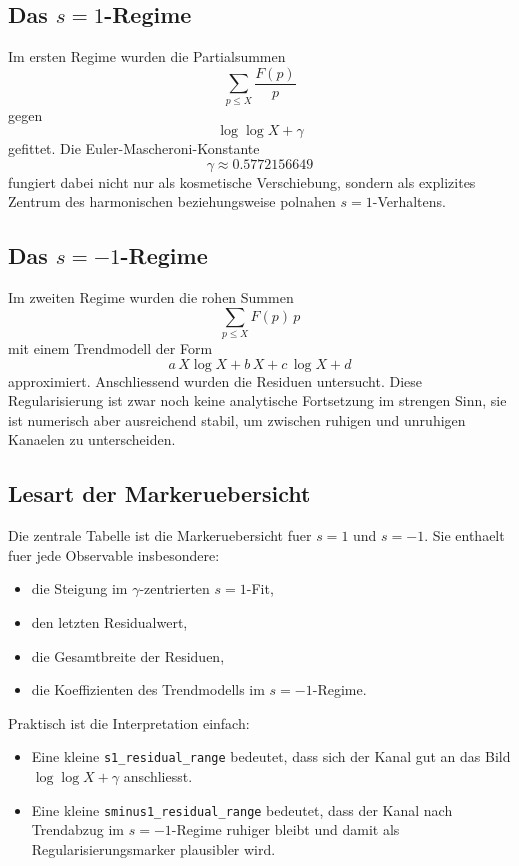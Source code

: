 \subsection{Das $s=1$-Regime}

Im ersten Regime wurden die Partialsummen
\[
\sum_{p\le X}\frac{F(p)}{p}
\]
gegen
\[
\log\log X+\gamma
\]
gefittet. Die Euler-Mascheroni-Konstante
\[
\gamma \approx 0.5772156649
\]
fungiert dabei nicht nur als kosmetische Verschiebung, sondern als
explizites Zentrum des harmonischen beziehungsweise polnahen
$s=1$-Verhaltens.

\subsection{Das $s=-1$-Regime}

Im zweiten Regime wurden die rohen Summen
\[
\sum_{p\le X} F(p)\,p
\]
mit einem Trendmodell der Form
\[
a\,X\log X+b\,X+c\,\log X+d
\]
approximiert. Anschliessend wurden die Residuen untersucht. Diese
Regularisierung ist zwar noch keine analytische Fortsetzung im strengen
Sinn, sie ist numerisch aber ausreichend stabil, um zwischen ruhigen und
unruhigen Kanaelen zu unterscheiden.

\subsection{Lesart der Markeruebersicht}

Die zentrale Tabelle ist die Markeruebersicht fuer $s=1$ und $s=-1$.
Sie enthaelt fuer jede Observable insbesondere:
\begin{itemize}
\item die Steigung im $\gamma$-zentrierten $s=1$-Fit,
\item den letzten Residualwert,
\item die Gesamtbreite der Residuen,
\item die Koeffizienten des Trendmodells im $s=-1$-Regime.
\end{itemize}

Praktisch ist die Interpretation einfach:
\begin{itemize}
\item Eine kleine \texttt{s1\_residual\_range} bedeutet, dass sich der
Kanal gut an das Bild $\log\log X+\gamma$ anschliesst.
\item Eine kleine \texttt{sminus1\_residual\_range} bedeutet, dass der
Kanal nach Trendabzug im $s=-1$-Regime ruhiger bleibt und damit als
Regularisierungsmarker plausibler wird.
\end{itemize}

